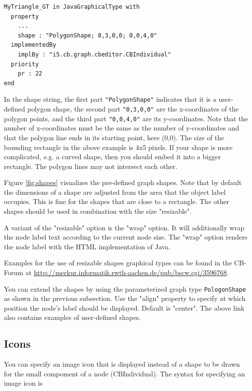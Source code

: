 {\small
\begin{verbatim}
MyTriangle_GT in JavaGraphicalType with  
  property
    ...
    shape : "PolygonShape; 0,3,0,0; 0,0,4,0"
  implementedBy
    implBy : "i5.cb.graph.cbeditor.CBIndividual"
  priority
    pr : 22
end 
\end{verbatim}
}

In the shape string, the first part {\tt "PolygonShape"} indicates that it is a user-defined
polygon shape, the second part {\tt "0,3,0,0"} are the x-coordinates of the polygon points,
and the third part {\tt "0,0,4,0"} are its y-coordinates. Note that the number of x-coordinates
must be the same as the number of y-coordinates and that the polygon line ends in its
starting point, here (0,0). The size of the bounding rectangle in the above example is 4x5 pixels.
If your shape is more complicated, e.g. a curved shape, then you should embed it into a 
bigger rectangle. 
The polygon lines may not intersect each other.




Figure \ref{fig:shapes} visualizes the pre-defined graph shapes. Note that
by default the dimensions of a shape are adjusted from the area that
the object label occupies. This is fine for the shapes that are close
to a rectangle. The other shapes should be used in combination with
the size "resizable".

A variant of the "resizable" option is the "wrap" option. It will additionally
wrap the node label text according to the current node size.
The "wrap" option renders the node label with the HTML implementation of Java.


Examples for the use of resizable shapes graphical types can be found in
the CB-Forum at
\url{http://merkur.informatik.rwth-aachen.de/pub/bscw.cgi/3596768}.


You can extend the shapes by using the parameterized graph type {\tt PologonShape}
as shown in the previous subsection. Use the "align" property to specify at which
position the node's label should be displayed. Default is "center".
The above link also contains examples of user-defined shapes. 




\subsection{Icons}
\label{sec:icons}

You can specify an image icon that is displayed instead of a shape to be drawn for the
small compoment of a node (CBIndividual). The syntax for specifying an image icon is

